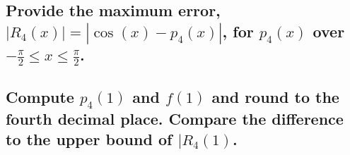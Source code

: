 \documentclass[12pt, letterpaper]{article}
\begin{document}
\subsection{Provide the maximum error, $|R_{4}{(x)}|=|\cos{(x)}-p_{4}{(x)}|$,
for $p_{4}{(x)}$ over $-\frac{\pi}{2}\leq x \leq \frac{\pi}{2}$.}



\hfill\blacksquare%
\subsection{Compute $p_{4}{(1)}$ and $f{(1)}$ and round to the fourth decimal
place. Compare the difference to the upper bound of $|R_{4}{(1)}$.}







\hfill\blacksquare%
\end{document}
